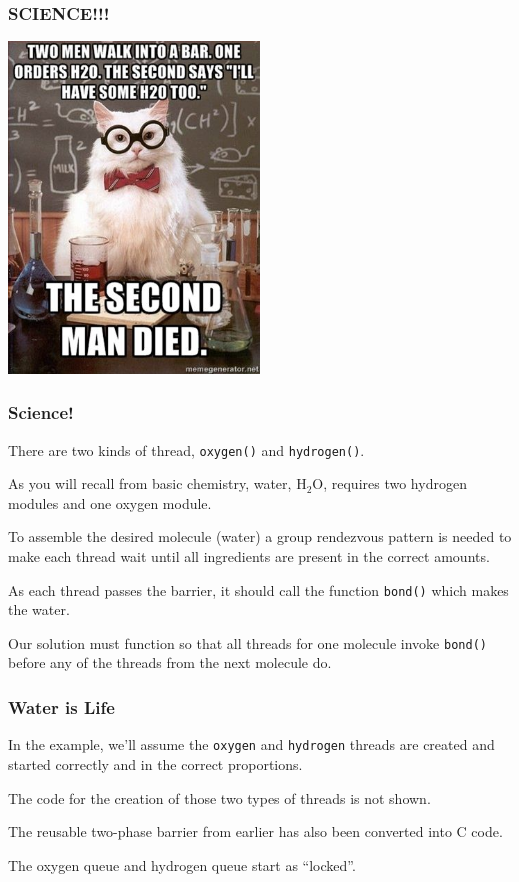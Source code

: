 \begin{frame}
	\frametitle{SCIENCE!!!}

	\begin{center}
		\includegraphics[width=0.5\textwidth]{images/h2o2.jpg}
	\end{center}


\end{frame}

\begin{frame}
	\frametitle{Science!}

	There are two kinds of thread, \texttt{oxygen()} and \texttt{hydrogen()}.

	As you will recall from basic chemistry, water, H$_{2}$O, requires two hydrogen modules and one oxygen module.

	To assemble the desired molecule (water) a group rendezvous pattern is needed to make each thread wait until all ingredients are present in the correct amounts.

	As each thread passes the barrier, it should call the function \texttt{bond()} which makes the water.

	Our solution must function so that all threads for one molecule invoke \texttt{bond()} before any of the threads from the next molecule do.

\end{frame}


\begin{frame}
	\frametitle{Water is Life}

	In the example, we'll assume the \texttt{oxygen} and \texttt{hydrogen} threads are created and started correctly and in the correct proportions.

	The code for the creation of those two types of threads is not shown.

	The reusable two-phase barrier from earlier has also been converted into C code.

	The oxygen queue and hydrogen queue start as ``locked''.

\end{frame}


